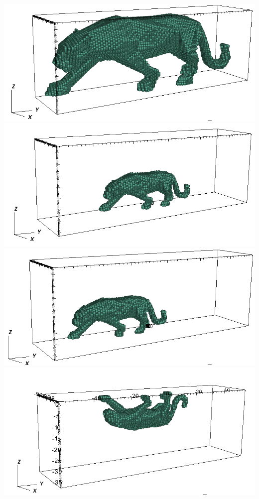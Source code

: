 \hspace{12pt}
\begin{minipage}{0.35\textwidth}
  \centering
  \includegraphics[width=\columnwidth]{FIGS/geometry/geom_tri_stl.png}
  \includegraphics[width=\columnwidth]{FIGS/geometry/geom_tri_stl_scale.png}
  \includegraphics[width=\columnwidth]{FIGS/geometry/geom_tri_stl_translate.png}
  \includegraphics[width=\columnwidth]{FIGS/geometry/geom_tri_stl_reflect.png}

\end{minipage}
